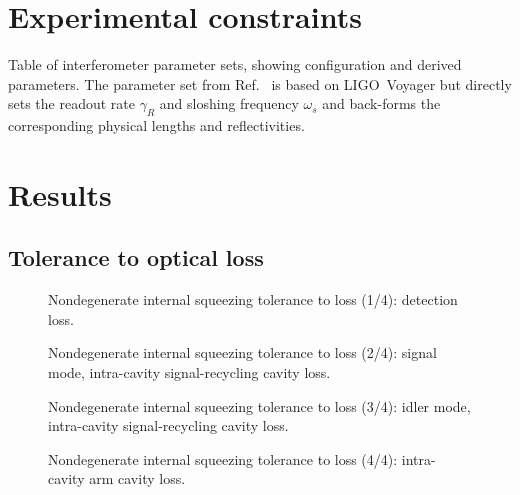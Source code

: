 \section{Experimental constraints} %




\begin{table}
	\caption{Table of interferometer parameter sets, showing configuration and derived parameters. The parameter set from Ref.~\cite{} is based on LIGO~Voyager but directly sets the readout rate $\gamma_R$ and sloshing frequency $\omega_s$ and back-forms the corresponding physical lengths and reflectivities. }
	\label{tab:}
\end{table}

\section{Results}


\subsection{Tolerance to optical loss}
\begin{figure}
	\centering
	\caption{Nondegenerate internal squeezing tolerance to loss (1/4): detection loss.}
	\label{fig:}
\end{figure}
\begin{figure}
	\centering
	\caption{Nondegenerate internal squeezing tolerance to loss (2/4): signal mode, intra-cavity signal-recycling cavity loss.}
	\label{fig:}
\end{figure}
\begin{figure}
	\centering
	\caption{Nondegenerate internal squeezing tolerance to loss (3/4): idler mode, intra-cavity signal-recycling cavity loss.}
	\label{fig:}
\end{figure}
\begin{figure}
	\centering
	\caption{Nondegenerate internal squeezing tolerance to loss (4/4): intra-cavity arm cavity loss.}
	\label{fig:}
\end{figure}

